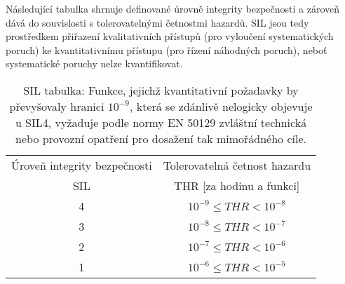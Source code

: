       Následující tabulka shrnuje definované úrovně integrity bezpečnosti a zároveň dává do
      souvislosti s tolerovatelnými četnostmi hazardů. SIL jsou tedy prostředkem přiřazení
      kvalitativních přístupů (pro vyloučení systematických poruch) ke kvantitativnímu přístupu
      (pro řízení náhodných poruch), neboť systematické poruchy nelze kvantifikovat.
      \begin{table}[h]
        \begin{tabular}{|c|c|}
          \hline
           Úroveň integrity 
           bezpečnosti &  Tolerovatelná četnost hazardu   \\          
             SIL       &   THR [za hodinu a funkci]       \\ \hline\hline 
              4        & \(10^{-9}\leq THR < 10^{-8}\)    \\ \hline
              3        & \(10^{-8}\leq THR < 10^{-7}\)    \\ \hline
              2        & \(10^{-7}\leq THR < 10^{-6}\)    \\ \hline
              1        & \(10^{-6}\leq THR < 10^{-5}\)    \\ \hline
        \end{tabular}
        \caption{SIL tabulka: Funkce, jejichž kvantitativní požadavky by převyšovaly 
                 hranici \(10^{-9}\), která se zdánlivě nelogicky objevuje u SIL4, vyžaduje
                 podle normy EN 50129 zvláštní technická nebo provozní opatření pro dosažení
                 tak mimořádného cíle.}
      \end{table}
       
